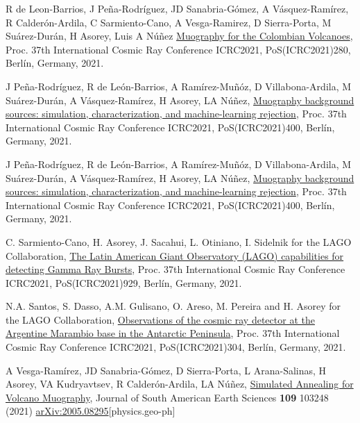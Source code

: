 \begin{etaremune}
\item {} R de Leon-Barrios, J Peña-Rodríguez, JD Sanabria-Gómez, A Vásquez-Ramírez, R Calderón-Ardila, C Sarmiento-Cano, A Vesga-Ramirez, D Sierra-Porta, M Suárez-Durán, H Asorey, Luis A Núñez \href{https://doi.org/10.22323/1.395.0280}{Muography for the Colombian Volcanoes}, \en Proc. 37th International Cosmic Ray Conference ICRC2021, PoS(ICRC2021)280, Berlín, Germany, 2021.

\item {} J Peña-Rodríguez, R de León-Barrios, A Ramírez-Muñóz, D Villabona-Ardila, M Suárez-Durán, A Vásquez-Ramírez, H Asorey, LA Núñez, \href{https://doi.org/10.22323/1.395.0400}{Muography background sources: simulation, characterization, and machine-learning rejection}, \en Proc. 37th International Cosmic Ray Conference ICRC2021, PoS(ICRC2021)400, Berlín, Germany, 2021.

\item {} J Peña-Rodríguez, R de León-Barrios, A Ramírez-Muñóz, D Villabona-Ardila, M Suárez-Durán, A Vásquez-Ramírez, H Asorey, LA Núñez, \href{https://doi.org/10.22323/1.395.0400}{Muography background sources: simulation, characterization, and machine-learning rejection}, \en Proc. 37th International Cosmic Ray Conference ICRC2021, PoS(ICRC2021)400, Berlín, Germany, 2021.

\item {} C. Sarmiento-Cano, H. Asorey, J. Sacahui, L. Otiniano, I. Sidelnik for the LAGO Collaboration, \href{https://doi.org/10.22323/1.395.0929}{The Latin American Giant Observatory (LAGO) capabilities for detecting Gamma Ray Bursts}, \en Proc. 37th International Cosmic Ray Conference ICRC2021, PoS(ICRC2021)929, Berlín, Germany, 2021.

\item {} N.A. Santos, S. Dasso, A.M. Gulisano, O. Areso, M. Pereira and H. Asorey for the LAGO Collaboration, \href{https://doi.org/10.22323/1.395.304}{Observations of the cosmic ray detector at the Argentine Marambio base in the Antarctic Peninsula}, \en Proc. 37th International Cosmic Ray Conference ICRC2021, PoS(ICRC2021)304, Berlín, Germany, 2021.

\item {} A Vesga-Ramírez, JD Sanabria-Gómez, D Sierra-Porta, L Arana-Salinas, H Asorey, VA Kudryavtsev, R Calderón-Ardila, LA Núñez, \href{https://doi.org/10.1016/j.jsames.2021.103248}{{Simulated Annealing for Volcano Muography}}, Journal of South American Earth Sciences {\bf{109}} 103248 (2021) \href{https://arxiv.org/abs/2005.08295}{arXiv:2005.08295}[physics.geo-ph]


\end{etaremune}

